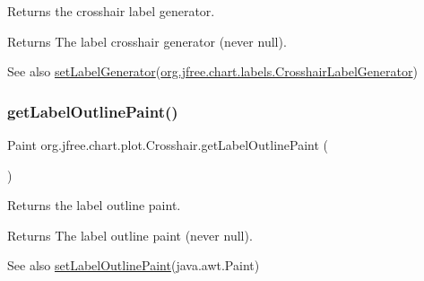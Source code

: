 Returns the crosshair label generator.

\begin{DoxyReturn}{Returns}
The label crosshair generator (never {\ttfamily null}).
\end{DoxyReturn}
\begin{DoxySeeAlso}{See also}
\mbox{\hyperlink{classorg_1_1jfree_1_1chart_1_1plot_1_1_crosshair_ac07a28b245af96a81878bb4ad015490c}{set\+Label\+Generator}}(\mbox{\hyperlink{interfaceorg_1_1jfree_1_1chart_1_1labels_1_1_crosshair_label_generator}{org.\+jfree.\+chart.\+labels.\+Crosshair\+Label\+Generator}}) 
\end{DoxySeeAlso}
\mbox{\label{classorg_1_1jfree_1_1chart_1_1plot_1_1_crosshair_ac01f9a5456e085677ea18840da944de0}} 
\subsubsection{\texorpdfstring{get\+Label\+Outline\+Paint()}{getLabelOutlinePaint()}}
{\footnotesize\ttfamily Paint org.\+jfree.\+chart.\+plot.\+Crosshair.\+get\+Label\+Outline\+Paint (\begin{DoxyParamCaption}{ }\end{DoxyParamCaption})}

Returns the label outline paint.

\begin{DoxyReturn}{Returns}
The label outline paint (never {\ttfamily null}).
\end{DoxyReturn}
\begin{DoxySeeAlso}{See also}
\mbox{\hyperlink{classorg_1_1jfree_1_1chart_1_1plot_1_1_crosshair_a66fecb4b6c255165fd0f116b3890f415}{set\+Label\+Outline\+Paint}}(java.\+awt.\+Paint) 
\end{DoxySeeAlso}
\mbox{\label{classorg_1_1jfree_1_1chart_1_1plot_1_1_crosshair_add1e46ed0170bc4cdb461d36229f481c}} 
